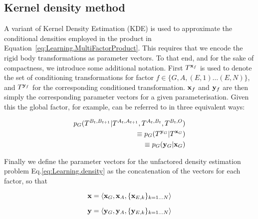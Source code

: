 \subsection{Kernel density method}\label{sec:Implementation.kde}

A variant of Kernel Density Estimation (KDE) \citep{scott2004multi-dimensional} is used to approximate the conditional densities employed in the product in Equation~\eqref{eq:Learning.MultiFactorProduct}. This requires that we encode the rigid body transformations as parameter vectors. To that end, and for the sake of compactness, we introduce some additional notation. First $T^{\mathbf{x}_f}$ is used to denote the set of conditioning transformations for factor $f \in \{G, A, (E,1) \ldots (E,N)\}$, and $T^{\mathbf{y}_f}$ for the corresponding conditioned transformation. $\mathbf{x}_f$ and $\mathbf{y}_f$ are then simply the corresponding parameter vectors for a given parameterisation. Given this the global factor, for example, can be referred to in three equivalent ways:

\begin{eqnarray}
p_G(T^{B_{t}, B_{t+1}}|T^{A_{t}, A_{t+1}}, T^{A_t, B_t}, T^{B_t, O}) \\ \equiv p_G(T^{\mathbf{y}_G}|T^{\mathbf{x}_G})  \\
\equiv p_G(\mathbf{y}_G|\mathbf{x}_G)
\end{eqnarray}

Finally we define the parameter vectors for the unfactored density estimation problem Eq.\eqref{eq:Learning.density} as the concatenation of the vectors for each factor, so that

\begin{equation}
\mathbf{x}= \langle \mathbf{x}_G, \mathbf{x}_A, \{\mathbf{x}_{E,k}\}_{k = 1 \ldots N} \rangle
\end{equation}

\begin{equation}
\mathbf{y} = \langle \mathbf{y}_G, \mathbf{y}_A, \{\mathbf{y}_{E,k}\}_{k = 1 \ldots N} \rangle
\end{equation}

